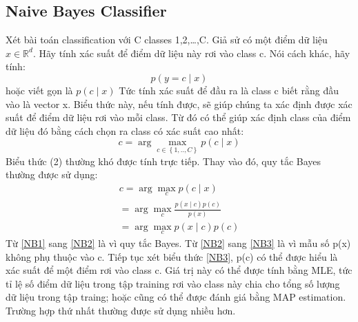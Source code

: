 \subsection{Naive Bayes Classifier}
	Xét bài toán classification với C classes 1,2,…,C. Giả sử có một điểm dữ liệu $x \in \mathbb{R}^d $. Hãy tính xác suất để điểm dữ liệu này rơi vào class c. Nói cách khác, hãy tính:
\begin{equation}
	p(y = c \mid x)
\end{equation}
	hoặc viết gọn là $p(c \mid x)$
	Tức tính xác suất để đầu ra là class c biết rằng đầu vào là vector x.
	Biểu thức này, nếu tính được, sẽ giúp chúng ta xác định được xác suất để điểm dữ liệu rơi vào mỗi class. Từ đó có thể giúp xác định class của điểm dữ liệu đó bằng cách chọn ra class có xác suất cao nhất:
\begin{equation}
	c = \arg\max_{c \in \left\{1,..,C \right\}} p(c \mid x)
\end{equation}
Biểu thức (2) thường khó được tính trực tiếp. Thay vào đó, quy tắc Bayes thường được sử dụng:
\begin{align}
	c = \arg\max_{c } p(c \mid x) \label{NB1} \\
	  = \arg\max_{c }\frac{p(x \mid c) p(c)}{p(x)} \label{NB2} \\
	  = \arg\max_{c } p(x \mid c) p(c) \label{NB3}
\end{align}
	Từ \eqref{NB1} sang \eqref{NB2} là vì quy tắc Bayes. Từ \eqref{NB2} sang \eqref{NB3} là vì mẫu số p(x) không phụ thuộc vào c.
	Tiếp tục xét biểu thức \eqref{NB3}, p(c) có thể được hiểu là xác suất để một điểm rơi vào class c. Giá trị này có thể được tính bằng MLE, tức tỉ lệ số điểm dữ liệu trong tập training rơi vào class này chia cho tổng số lượng dữ liệu trong tập traing; hoặc cũng có thể được đánh giá bằng MAP estimation. Trường hợp thứ nhất thường được sử dụng nhiều hơn.
	
